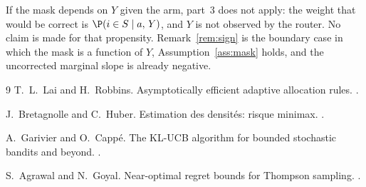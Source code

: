 \documentclass{article}
\theoremstyle{definition}
\theoremstyle{remark}
\begin{document}
If the mask depends on $Y$ given the arm, part~3 does not apply: the weight that would be correct is $\P(i\in S\mid a,\,Y)$, and $Y$ is not observed by the router. No claim is made for that propensity. Remark~\ref{rem:sign} is the boundary case in which the mask is a function of $Y$, Assumption~\ref{ass:mask} holds, and the uncorrected marginal slope is already negative.

\begin{thebibliography}{9}
T.~L.~Lai and H.~Robbins.
\newblock Asymptotically efficient adaptive allocation rules.
.

J.~Bretagnolle and C.~Huber.
\newblock Estimation des densit\'es: risque minimax.
.

A.~Garivier and O.~Capp\'e.
\newblock The KL-UCB algorithm for bounded stochastic bandits and beyond.
.

S.~Agrawal and N.~Goyal.
\newblock Near-optimal regret bounds for Thompson sampling.
.
\end{thebibliography}
\end{document}
